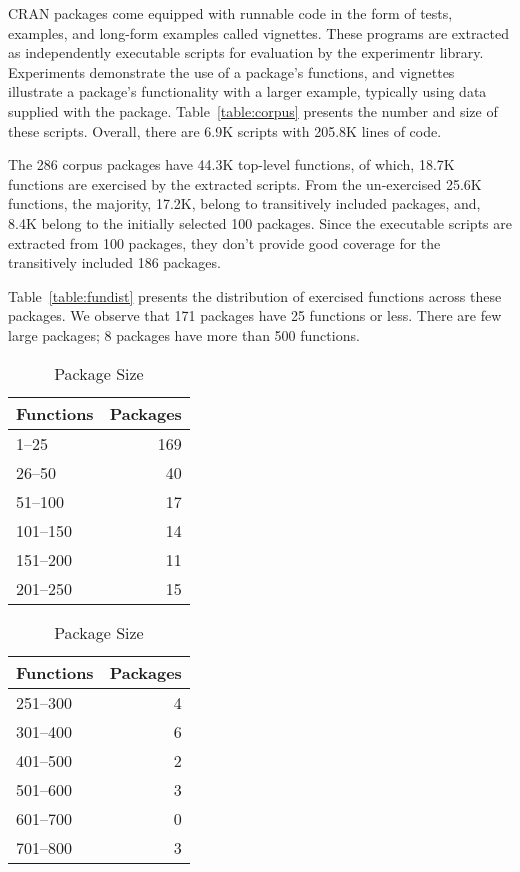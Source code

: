 \documentclass[10pt,review,sigplan,anonymous=true,authorversion=true,nonacm=true]{acmart}
\newcommand{\experimentr}{{\sf experimentr}\xspace}
\begin{document}
CRAN packages come equipped with runnable code in the form of tests, examples,
and long-form examples called vignettes. These programs are extracted as
independently executable scripts for evaluation by the \experimentr library.
Experiments demonstrate the use of a package's functions, and vignettes
illustrate a package's functionality with a larger example, typically using data
supplied with the package. Table~\ref{table:corpus} presents the number and size
of these scripts. Overall, there are 6.9K scripts with 205.8K lines of code.

The 286 corpus packages have 44.3K top-level functions, of which, 18.7K
functions are exercised by the extracted scripts. From the un-exercised 25.6K
functions, the majority, 17.2K, belong to transitively included packages, and,
8.4K belong to the initially selected 100 packages. Since the executable scripts
are extracted from 100 packages, they don't provide good coverage for the
transitively included 186 packages.

Table~\ref{table:fundist} presents the distribution of exercised functions
across these packages. We observe that 171 packages have 25 functions or less.
There are few large packages; 8 packages have more than 500 functions.

\begin{table}[!h]
  \vspace{-2mm}
  \small
  \caption{Package Size} \label{table:packsize}
  \centering
  \begin{tabular}{lr}
    \toprule
    \bf Functions&\bf Packages\\
    \midrule
    1--25&169\\
    26--50&40\\
    51--100&17\\
    101--150&14\\
    151--200&11\\
    201--250&15\\
    \bottomrule
  \end{tabular}
  \quad
  \begin{tabular}{lr}
    \toprule
    \bf Functions&\bf Packages\\
    \midrule
    251--300&4\\
    301--400&6\\
    401--500&2\\
    501--600&3\\
    601--700&0\\
    701--800&3\\
    \bottomrule
  \end{tabular}
\end{table}
\end{document}
